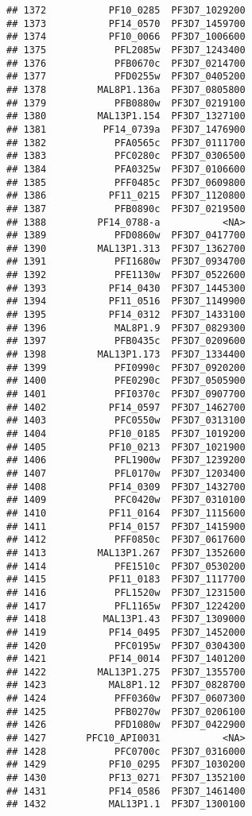 \documentclass[12pt, a4paper]{article}\usepackage[]{graphicx}\usepackage[]{color}
\makeatletter
\newenvironment{kframe}{%
 \def\at@end@of@kframe{}%
 \ifinner\ifhmode%
  \def\at@end@of@kframe{\end{minipage}}%
  \begin{minipage}{\columnwidth}%
 \fi\fi%
 \def\FrameCommand##1{\hskip\@totalleftmargin \hskip-\fboxsep
 \colorbox{shadecolor}{##1}\hskip-\fboxsep
     \hskip-\linewidth \hskip-\@totalleftmargin \hskip\columnwidth}%
 \MakeFramed {\advance\hsize-\width
   \@totalleftmargin\z@ \linewidth\hsize
   \@setminipage}}%
 {\par\unskip\endMakeFramed%
 \at@end@of@kframe}
\newenvironment{knitrout}{}{} %
\makeatother
\begin{document}
\begin{knitrout}
\begin{kframe}
\begin{verbatim}
## 1372           PF10_0285  PF3D7_1029200
## 1373           PF14_0570  PF3D7_1459700
## 1374           PF10_0066  PF3D7_1006600
## 1375            PFL2085w  PF3D7_1243400
## 1376            PFB0670c  PF3D7_0214700
## 1377            PFD0255w  PF3D7_0405200
## 1378         MAL8P1.136a  PF3D7_0805800
## 1379            PFB0880w  PF3D7_0219100
## 1380         MAL13P1.154  PF3D7_1327100
## 1381          PF14_0739a  PF3D7_1476900
## 1382            PFA0565c  PF3D7_0111700
## 1383            PFC0280c  PF3D7_0306500
## 1384            PFA0325w  PF3D7_0106600
## 1385            PFF0485c  PF3D7_0609800
## 1386           PF11_0215  PF3D7_1120800
## 1387            PFB0890c  PF3D7_0219500
## 1388         PF14_0788-a           <NA>
## 1389            PFD0860w  PF3D7_0417700
## 1390         MAL13P1.313  PF3D7_1362700
## 1391            PFI1680w  PF3D7_0934700
## 1392            PFE1130w  PF3D7_0522600
## 1393           PF14_0430  PF3D7_1445300
## 1394           PF11_0516  PF3D7_1149900
## 1395           PF14_0312  PF3D7_1433100
## 1396            MAL8P1.9  PF3D7_0829300
## 1397            PFB0435c  PF3D7_0209600
## 1398         MAL13P1.173  PF3D7_1334400
## 1399            PFI0990c  PF3D7_0920200
## 1400            PFE0290c  PF3D7_0505900
## 1401            PFI0370c  PF3D7_0907700
## 1402           PF14_0597  PF3D7_1462700
## 1403            PFC0550w  PF3D7_0313100
## 1404           PF10_0185  PF3D7_1019200
## 1405           PF10_0213  PF3D7_1021900
## 1406            PFL1900w  PF3D7_1239200
## 1407            PFL0170w  PF3D7_1203400
## 1408           PF14_0309  PF3D7_1432700
## 1409            PFC0420w  PF3D7_0310100
## 1410           PF11_0164  PF3D7_1115600
## 1411           PF14_0157  PF3D7_1415900
## 1412            PFF0850c  PF3D7_0617600
## 1413         MAL13P1.267  PF3D7_1352600
## 1414            PFE1510c  PF3D7_0530200
## 1415           PF11_0183  PF3D7_1117700
## 1416            PFL1520w  PF3D7_1231500
## 1417            PFL1165w  PF3D7_1224200
## 1418          MAL13P1.43  PF3D7_1309000
## 1419           PF14_0495  PF3D7_1452000
## 1420            PFC0195w  PF3D7_0304300
## 1421           PF14_0014  PF3D7_1401200
## 1422         MAL13P1.275  PF3D7_1355700
## 1423           MAL8P1.12  PF3D7_0828700
## 1424            PFF0360w  PF3D7_0607300
## 1425            PFB0270w  PF3D7_0206100
## 1426            PFD1080w  PF3D7_0422900
## 1427       PFC10_API0031           <NA>
## 1428            PFC0700c  PF3D7_0316000
## 1429           PF10_0295  PF3D7_1030200
## 1430           PF13_0271  PF3D7_1352100
## 1431           PF14_0586  PF3D7_1461400
## 1432           MAL13P1.1  PF3D7_1300100

\end{verbatim}
\end{kframe}
\end{knitrout}
\end{document}
